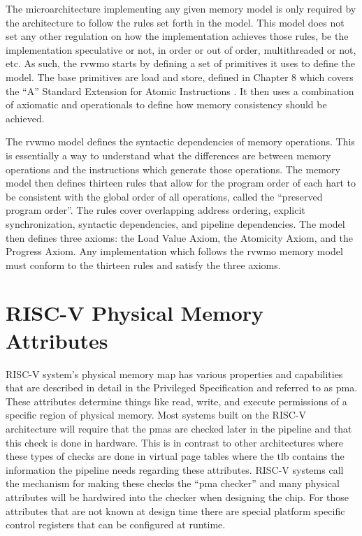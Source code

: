 The microarchitecture implementing any given memory model is only required by the architecture to follow the rules set forth in the model. This model does not set any other regulation on how the implementation achieves those rules, be the implementation speculative or not, in order or out of order, multithreaded or not, etc. As such, the \gls{rvwmo} starts by defining a set of primitives it uses to define the model. The base primitives are load and store, defined in Chapter 8 which covers the ``A'' Standard Extension for Atomic Instructions \cite{UnprivIsa2019}. It then uses a combination of \gls{axiomatic} and \glspl{operational} to define how memory consistency should be achieved.

The \gls{rvwmo} model defines the syntactic dependencies of memory operations. This is essentially a way to understand what the differences are between memory operations and the instructions which generate those operations. The memory model then defines thirteen rules that allow for the program order of each \gls{hart} to be consistent with the global order of all operations, called the ``preserved program order''. The rules cover overlapping address ordering, explicit synchronization, syntactic dependencies, and pipeline dependencies. The model then defines three axioms: the Load Value Axiom, the Atomicity Axiom, and the Progress Axiom. Any implementation which follows the \gls{rvwmo} memory model must conform to the thirteen rules and satisfy the three axioms.

\section{RISC-V Physical Memory Attributes}
RISC-V system's physical memory map has various properties and capabilities that are described in detail in the Privileged Specification \cite{PrivIsa2019} and referred to as \gls{pma}. These attributes determine things like read, write, and execute permissions of a specific region of physical memory. Most systems built on the RISC-V architecture will require that the \glspl{pma} are checked later in the pipeline and that this check is done in hardware. This is in contrast to other architectures where these types of checks are done in virtual page tables where the \gls{tlb} contains the information the pipeline needs regarding these attributes. RISC-V systems call the mechanism for making these checks the ``\gls{pma} checker'' and many physical attributes will be hardwired into the checker when designing the chip. For those attributes that are not known at design time there are special platform specific control registers that can be configured at runtime.

